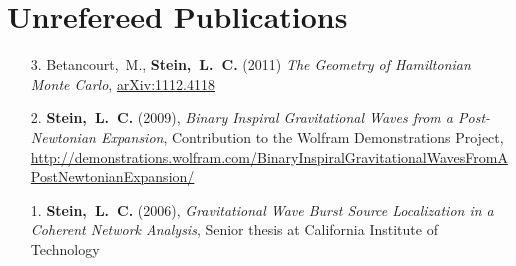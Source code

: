 \section{\sc Unrefereed Publications}
\begin{enumerate}
\item[{3.}] Betancourt,~M., {\bf Stein,~L.~C.} (2011) {\it The
    Geometry of Hamiltonian Monte Carlo}, \href{http://arxiv.org/abs/1112.4118}{arXiv:1112.4118}
\item[{2.}] {\bf Stein,~L.~C.} (2009), {\it Binary Inspiral
    Gravitational Waves from a Post-Newtonian Expansion}, Contribution
  to the Wolfram Demonstrations Project, \url{http://demonstrations.wolfram.com/BinaryInspiralGravitationalWavesFromAPostNewtonianExpansion/}
\item[{1.}] {\bf Stein,~L.~C.} (2006), {\it Gravitational Wave Burst Source Localization in a Coherent Network Analysis}, Senior thesis at California Institute of Technology
\end{enumerate}

